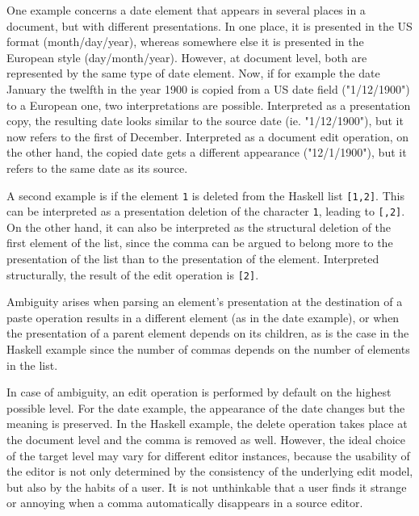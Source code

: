 One example concerns a date element that appears in several places in a document, but with different presentations. In one place, it is presented in the US format (month/day/year), whereas somewhere else it is presented in the European style (day/month/year). However, at document level, both are represented by the same type of date element. Now, if for example the date January the twelfth in the year 1900 is copied from a US date field ("1/12/1900") to a European one, two interpretations are possible. Interpreted as a presentation copy, the resulting date looks similar to the source date (ie. "1/12/1900"), but it now refers to the first of December. Interpreted as a document edit operation, on the other hand, the copied date gets a different appearance ("12/1/1900"), but it refers to the same date as its source.

A second example is if the element \verb|1| is deleted from the Haskell list \verb|[1,2]|. This can be interpreted as a presentation deletion of the character \verb|1|, leading to \verb|[,2]|.  On the other hand, it can also be interpreted as the structural deletion of the first element of the list, since the comma can be argued to belong more to the presentation of the list than to the presentation of the element. Interpreted structurally, the result of the edit operation is \verb|[2]|. 

Ambiguity arises when parsing an element's presentation at the destination of a paste operation results in a different element (as in the date example), or when the presentation of a parent element depends on its children, as is the case in the Haskell example since the number of commas depends on the number of elements in the list. 


In case of ambiguity, an edit operation is performed by default on the highest possible level. For the date example, the appearance of the date changes but the meaning is preserved. In the Haskell example, the delete operation takes place at the document level and the comma is removed as well. However, the ideal choice of the target level may vary for different editor instances, because the usability of the editor is not only determined by the consistency of the underlying edit model, but also by the habits of a user. It is not unthinkable that a user finds it strange or annoying when a comma automatically disappears in a source editor. 

